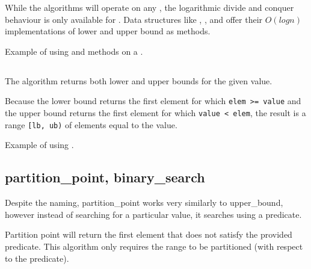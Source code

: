 While the algorithms will operate on any , the logarithmic divide and conquer behaviour is only available for . Data structures like , ,  and  offer their $O(logn)$ implementations of lower and upper bound as methods.

\begin{box-note}
\footnotesize Example of using  and  methods on a .
\tcblower
{}
\end{box-note}

\subsection{\texorpdfstring{}{\texttt{std::equal\_range}}}

The  algorithm returns both lower and upper bounds for the given value.


Because the lower bound returns the first element for which \texttt{elem >= value} and the upper bound returns the first element for which \texttt{value < elem}, the result is a range \texttt{[lb, ub)} of elements equal to the value.

\begin{box-note}
\footnotesize Example of using .
\tcblower
{}
\end{box-note}

\subsection{partition\_point, binary\_search}

Despite the naming, partition\_point works very similarly to upper\_bound, however instead of searching for a particular value, it searches using a predicate.



Partition point will return the first element that does not satisfy the provided predicate. This algorithm only requires the range to be partitioned (with respect to the predicate).

